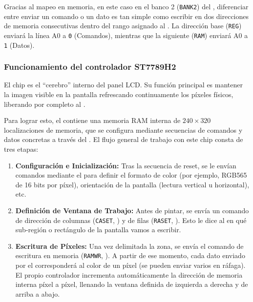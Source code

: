 \documentclass[../main.tex]{subfiles}
\begin{document}
            Gracias al mapeo en memoria, en este caso en el banco 2 (\texttt{BANK2}) del , diferenciar entre enviar un comando o un dato es tan simple como escribir en dos direcciones de memoria consecutivas dentro del rango asignado al . La dirección base (\texttt{REG}) enviará la línea A0 a \texttt{0} (Comandos), mientras que la siguiente (\texttt{RAM}) enviará A0 a \texttt{1} (Datos).

        \subsubsection{Funcionamiento del controlador ST7789H2}

            El chip \LCDMAN es el ``cerebro'' interno del panel LCD. Su función principal es mantener la imagen visible en la pantalla refrescando continuamente los píxeles físicos, liberando por completo al \MCU.

            Para lograr esto, el \LCDMAN contiene una memoria RAM interna de $240 \times 320$ localizaciones de memoria, que se configura mediante secuencias de comandos y datos concretas a través del . El flujo general de trabajo con este chip consta de tres etapas:

            \begin{enumerate}
                \item \textbf{Configuración e Inicialización:} Tras la secuencia de reset, se le envían comandos mediante el  para definir el formato de color (por ejemplo, RGB565 de 16 bits por píxel), orientación de la pantalla (lectura vertical u horizontal), etc.
                \item \textbf{Definición de Ventana de Trabajo:} Antes de pintar, se envía un comando de dirección de columnas (\texttt{CASET}, \LCDMAN[9.1.20]) y de filas (\texttt{RASET}, \LCDMAN[9.1.21]). Esto le dice al \LCDMAN en qué sub-región o rectángulo de la pantalla vamos a escribir.
                \item \textbf{Escritura de Píxeles:} Una vez delimitada la zona, se envía el comando de escritura en memoria (\texttt{RAMWR}, \LCDMAN[9.1.22]). A partir de ese momento, cada dato enviado por el  corresponderá al color de un píxel (se pueden enviar varios en ráfaga). El propio controlador incrementa automáticamente la dirección de memoria interna píxel a píxel, llenando la ventana definida de izquierda a derecha y de arriba a abajo.
            \end{enumerate}
\end{document}
